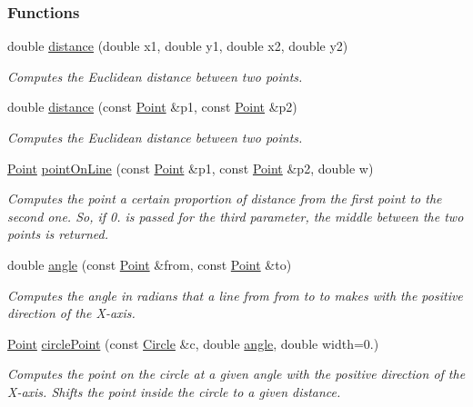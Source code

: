 \subsubsection*{Functions}
\begin{DoxyCompactItemize}
\item 
double \hyperlink{namespaceslb_1_1core_1_1util_1_1gu_a529d378309ce8434c3ef7af3ea9e837c}{distance} (double x1, double y1, double x2, double y2)
\begin{DoxyCompactList}\small\item\em Computes the Euclidean distance between two points. \end{DoxyCompactList}\item 
double \hyperlink{namespaceslb_1_1core_1_1util_1_1gu_abdca6fd443babed63b1653f3b8e99c42}{distance} (const \hyperlink{structslb_1_1core_1_1util_1_1gu_1_1Point}{Point} \&p1, const \hyperlink{structslb_1_1core_1_1util_1_1gu_1_1Point}{Point} \&p2)
\begin{DoxyCompactList}\small\item\em Computes the Euclidean distance between two points. \end{DoxyCompactList}\item 
\hyperlink{structslb_1_1core_1_1util_1_1gu_1_1Point}{Point} \hyperlink{namespaceslb_1_1core_1_1util_1_1gu_a955b2a5a7a5d669c4136eb7a744c97d3}{point\+On\+Line} (const \hyperlink{structslb_1_1core_1_1util_1_1gu_1_1Point}{Point} \&p1, const \hyperlink{structslb_1_1core_1_1util_1_1gu_1_1Point}{Point} \&p2, double w)
\begin{DoxyCompactList}\small\item\em Computes the point a certain proportion of distance from the first point to the second one. So, if 0. is passed for the third parameter, the middle between the two points is returned. \end{DoxyCompactList}\item 
double \hyperlink{namespaceslb_1_1core_1_1util_1_1gu_a1292402a8a80202220442b85cc7b057b}{angle} (const \hyperlink{structslb_1_1core_1_1util_1_1gu_1_1Point}{Point} \&from, const \hyperlink{structslb_1_1core_1_1util_1_1gu_1_1Point}{Point} \&to)
\begin{DoxyCompactList}\small\item\em Computes the angle in radians that a line from {\ttfamily from} to {\ttfamily to} makes with the positive direction of the X-\/axis. \end{DoxyCompactList}\item 
\hyperlink{structslb_1_1core_1_1util_1_1gu_1_1Point}{Point} \hyperlink{namespaceslb_1_1core_1_1util_1_1gu_ac3f0d893ff13987d17f22eac842cce52}{circle\+Point} (const \hyperlink{structslb_1_1core_1_1util_1_1gu_1_1Circle}{Circle} \&c, double \hyperlink{namespaceslb_1_1core_1_1util_1_1gu_a1292402a8a80202220442b85cc7b057b}{angle}, double width=0.)
\begin{DoxyCompactList}\small\item\em Computes the point on the circle at a given angle with the positive direction of the X-\/axis. Shifts the point inside the circle to a given distance. \end{DoxyCompactList}\end{DoxyCompactItemize}



